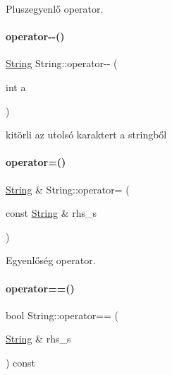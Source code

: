 Pluszegyenlő operator. 

\mbox{\label{class_string_a79869b69dd0106b1b6d179f760d6527a}} 
\paragraph{\texorpdfstring{operator-\/-\/()}{operator--()}}
{\footnotesize\ttfamily \mbox{\hyperlink{class_string}{String}} String\+::operator-\/-\/ (\begin{DoxyParamCaption}\item[{int}]{a }\end{DoxyParamCaption})}



kitörli az utolsó karaktert a stringből 

\mbox{\label{class_string_a803e6112834d4c0cdb0da6c6a4000e6e}} 
\paragraph{\texorpdfstring{operator=()}{operator=()}}
{\footnotesize\ttfamily \mbox{\hyperlink{class_string}{String}} \& String\+::operator= (\begin{DoxyParamCaption}\item[{const \mbox{\hyperlink{class_string}{String}} \&}]{rhs\+\_\+s }\end{DoxyParamCaption})}



Egyenlőség operator. 

\mbox{\label{class_string_aa94d2477f4f80aad7703bf4d7a39d332}} 
\paragraph{\texorpdfstring{operator==()}{operator==()}\hspace{0.1cm}{\footnotesize\ttfamily [1/4]}}
{\footnotesize\ttfamily bool String\+::operator== (\begin{DoxyParamCaption}\item[{\mbox{\hyperlink{class_string}{String}} \&}]{rhs\+\_\+s }\end{DoxyParamCaption}) const}



